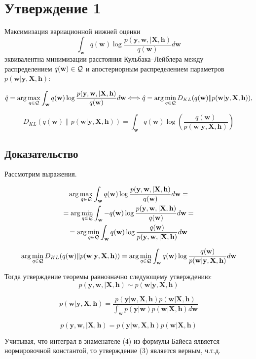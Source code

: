 \documentclass[a4paper,12pt,notitlepage]{article}
\def\Q{{\cal Q}}
\def\w{{\textbf{w}}}
\def\h{{\textbf{h}}}
\def\y{{\textbf{y}}}
\def\X{{\textbf{X}}}
\begin{document}

\section*{Утверждение 1}

Максимизация вариационной нижней оценки
$$ \int_{\w}q(\w)\log\frac{p(\y, \w, | \X, \h)}{q(\w)}d\w  $$
эквивалентна минимизации расстояния Кульбака–Лейблера между распределением
$q(\w) \in \Q$ и апостериорным распределением параметров $p(\w | \y, \X, \h)$:

$$ \hat{q} = \arg \max_{q \in \Q} \int_{\w}q(\w)\log\frac{p(\y, \w, | \X, \h)}{q(\w)}d\w  \Longleftrightarrow \hat{q} = \arg \min_{q \in \Q} D_{KL}(q(\w)\|p(\w|\y, \X, \h)), $$

$$D_{KL}(q(\w)\|p(\w|\y, \X, \h)) =  \int_{\w}q(\w) \log(\frac{q(\w)}{p(\w|\y, \X, \h)})$$

\subsection*{Доказательство}
Рассмотрим выражения.


\begin{multline}
\arg \max_{q \in \Q} \int_{\w}q(\w)\log\frac{p(\y, \w, | \X, \h)}{q(\w)}d\w = \\
 =\arg \min_{q \in \Q} \int_{\w}-q(\w)\log\frac{p(\y, \w, | \X, \h)}{q(\w)}d\w = \\
 = \arg \min_{q \in \Q} \int_{\w}q(\w)\log\frac{q(\w)}{p(\y, \w, | \X, \h)}d\w  
\end{multline}


\begin{equation}
\arg \min_{q \in \Q} D_{KL}(q(\w)\|p(\w|\y, \X, \h)) = \arg \min_{q \in \Q} \int_{\w}q(\w) \log\frac{q(\w)}{p(\w|\y, \X, \h)} d\w  
\end{equation}

Тогда утверждение теоремы равнозначно следующему утверждению:
\begin{equation}
  p(\y, \w, | \X, \h) \sim  p(\w|\y, \X, \h)
\end{equation}

\begin{equation}
  p(\w|\y, \X, \h) = \frac{p(\y|\w, \X, \h)p(\w|\X, \h)}{\int_{\w} p(\y|\w)p(\w|\X, \h) d\w}
\end{equation}

\begin{equation}
  p(\y, \w, | \X, \h)= {p(\y|\w, \X, \h)p(\w|\X, \h)} 
\end{equation}

Учитывая, что интеграл в знаменателе (4) из формулы Байеса ялвяется нормировочной константой, то утверждение (3) является верным, ч.т.д.
\end{document}
